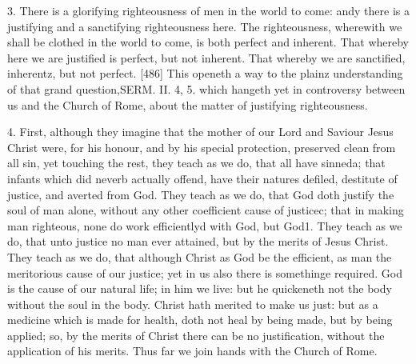3. There is a glorifying righteousness of men in the world to come: andy there is a justifying and a sanctifying righteousness here. The righteousness, wherewith we shall be clothed in the world to come, is both perfect and inherent. That whereby here we are justified is perfect, but not inherent. That whereby we are sanctified, inherentz, but not perfect. [486] This openeth a way to the plainz understanding of that grand question,SERM. II. 4, 5. which hangeth yet in controversy between us and the Church of Rome, about the matter of justifying righteousness.

4. First, although they imagine that the mother of our Lord and Saviour Jesus Christ were, for his honour, and by his special protection, preserved clean from all sin, yet touching the rest, they teach as we do, that all have sinneda; that infants which did neverb actually offend, have their natures defiled, destitute of justice, and averted from God. They teach as we do, that God doth justify the soul of man alone, without any other coefficient cause of justicec; that in making man righteous, none do work efficientlyd with God, but God1. They teach as we do, that unto justice no man ever attained, but by the merits of Jesus Christ. They teach as we do, that although Christ as God be the efficient, as man the meritorious cause of our justice; yet in us also there is somethinge required. God is the cause of our natural life; in him we live: but he quickeneth not the body without the soul in the body. Christ hath merited to make us just: but as a medicine which is made for health, doth not heal by being made, but by being applied; so, by the merits of Christ there can be no justification, without the application of his merits. Thus far we join hands with the Church of Rome.

